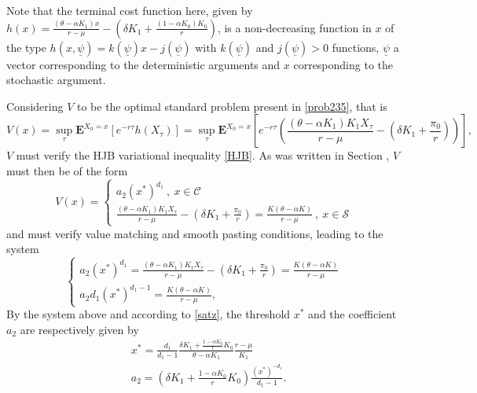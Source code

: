 Note that the terminal cost function here, given by $h(x)=\frac{(\theta-\alpha K_1)x}{r-\mu} - \left( \delta K_1  +\frac{(1-\alpha K_0) K_0}{r}\right)$, is a non-decreasing function in $x$ of the type $h(x,\underline{\psi})=k(\underline{\psi})x-j(\underline{\psi})$ with $k(\underline{\psi})$ and $j(\underline{\psi}) > 0$ functions, $\underline{\psi}$  a vector corresponding to the deterministic arguments and $x$ corresponding to the stochastic argument.

Considering $V$ to be the optimal standard problem present in \eqref{prob235}, that is
\begin{equation}
V(x)=  \sup _\tau \textbf{E}^{X_0=x} \left[ e^{-r\tau}h(X_\tau) \right] 
=\sup _\tau \textbf{E}^{X_0=x} \left[ e^{-r\tau}\left(\frac{(\theta-\alpha K_1)K_1 X_\tau}{r-\mu} - \left( \delta K_1  +\frac{\pi_0}{r}\right)  \right) \right],
\end{equation} 
$V$ must verify the HJB variational inequality \eqref{HJB}. As was written in Section , $V$ must then be of the form
\begin{equation}
V(x)=\begin{cases} a_2(x^*)^{d_1} \ , \ x \in \mathcal{C} \\
\frac{(\theta-\alpha K_1)K_1 X_\tau}{r-\mu} - \left( \delta K_1  +\frac{\pi_0}{r}\right)=\frac{K(\theta-\alpha K)}{r-\mu} \ , \ x \in \mathcal{S}
\end{cases}
\end{equation}
and must verify value matching and smooth pasting conditions, leading to the system
\begin{equation}
\begin{cases} a_2(x^*)^{d_1}=\frac{(\theta-\alpha K_1)K_1 X_\tau}{r-\mu} - \left( \delta K_1  +\frac{\pi_0}{r}\right)=\frac{K(\theta-\alpha K)}{r-\mu} \\
a_2d_1(x^*)^{d_1-1}=\frac{K(\theta-\alpha K)}{r-\mu},
\end{cases}
\label{eq:sistema2}
\end{equation}
By the system above and according to \ref{satz}, the threshold  $x^*$ and the coefficient $a_2$ are respectively given by
\begin{align}
&x^*=\frac{d_1}{d_1-1} \frac{ \delta K_1  +\frac{1-\alpha K_0}{r}K_0 }{\theta-\alpha K_1} \frac{r-\mu}{K_1} \\
&a_2=\left( \delta K_1 +\frac{1-\alpha K_0}{r}K_0 \right) \frac{(x^*)^{-d_1}}{d_1-1} \nonumber.
\end{align}

